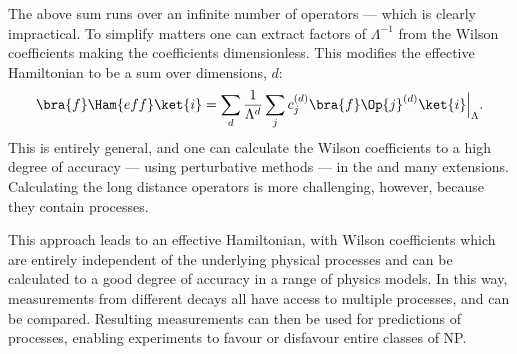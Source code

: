 The above sum runs over an infinite number of operators --- which is clearly impractical.
To simplify matters one can extract factors of $\Lambda^{-1}$ from the Wilson coefficients
making the coefficients dimensionless.
This modifies the effective Hamiltonian to be a sum over dimensions, $d$:
\begin{equation}
  \bra{f}\Ham{eff}\ket{i} =
  \sum_{d}\frac{1}{\Lambda^{d}}
  \sum_j c_j^{(d)}\bra{f}\Op{j}^{(d)}\ket{i}\Big|_{\Lambda}.
  \label{eq:th:opehamnorm}
\end{equation}
This is entirely general, and one can calculate the Wilson coefficients to a high degree of
accuracy --- using perturbative methods --- in the \sm and many \bsm extensions.
Calculating the long distance operators is more challenging, however, because they contain \QCD
processes.

This approach leads to an effective Hamiltonian, with Wilson coefficients which are entirely
independent of the underlying physical processes and can be calculated to a good degree of accuracy
in a range of physics models.
In this way, measurements from different decays all have access to multiple processes, and can be
compared.
Resulting measurements can then be used for predictions of processes, enabling experiments to
favour or disfavour entire classes of NP.



